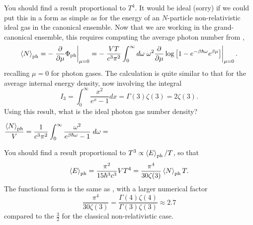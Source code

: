 You should find a result proportional to $T^4$.
It would be ideal (sorry) if we could put this in a form as simple as  for the energy of an $N$-particle non-relativistic ideal gas in the canonical ensemble.
Now that we are working in the grand-canonical ensemble, this requires computing the average photon number from ,
\begin{equation*}
  \left\langle N \right\rangle_{\text{ph}} = -\left. \frac{\partial }{\partial \mu} \Phi_{\text{ph}}\right|_{\mu = 0} = -\left. \frac{VT}{c^3 \pi^2} \int_0^{\infty} d\omega \; \omega^2 \frac{\partial }{\partial \mu} \log\left[1 - e^{-\beta \hbar \omega} e^{\beta \mu}\right] \right|_{\mu = 0}.
\end{equation*}
recalling $\mu = 0$ for photon gases.
The calculation is quite similar to that for the average internal energy density, now involving the integral
\begin{equation*}
  I_3 = \int_0^{\infty} \frac{x^2}{e^x - 1} dx = \Gamma(3) \zeta(3) = 2\zeta(3).
\end{equation*}
Using this result, what is the ideal photon gas number density?
\begin{mdframed}
  $\displaystyle \frac{\left\langle N \right\rangle_{\text{ph}}}{V} = \frac{1}{c^3 \pi^2} \int_0^{\infty} \frac{\omega^2}{e^{\beta \hbar \omega} - 1} \; d\omega = $ \\[100 pt]
\end{mdframed}

You should find a result proportional to $T^3 \propto \left\langle E \right\rangle_{\text{ph}} / T$, so that
\begin{equation}
  \left\langle E \right\rangle_{\text{ph}} = \frac{\pi^2}{15 \hbar^3 c^3} VT^4 = \frac{\pi^4}{30\zeta(3)} \left\langle N \right\rangle_{\text{ph}} T.
\end{equation}
The functional form is the same as , with a larger numerical factor
\begin{equation*}
  \frac{\pi^4}{30\zeta(3)} = \frac{\Gamma(4) \zeta(4)}{\Gamma(3) \zeta(3)} \approx 2.7
\end{equation*}
compared to the $\frac{3}{2}$ for the classical non-relativistic case.

